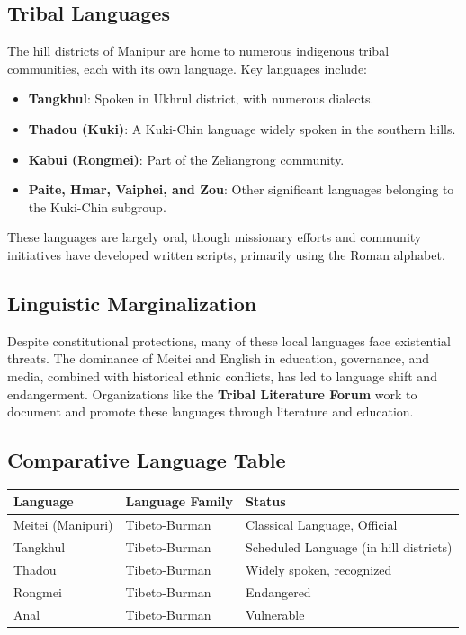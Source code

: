 \documentclass{article}
\begin{document}
\subsection{Tribal Languages}
The hill districts of Manipur are home to numerous indigenous tribal communities, each with its own language. Key languages include:
\begin{itemize}
    \item \textbf{Tangkhul}: Spoken in Ukhrul district, with numerous dialects.
    \item \textbf{Thadou (Kuki)}: A Kuki-Chin language widely spoken in the southern hills.
    \item \textbf{Kabui (Rongmei)}: Part of the Zeliangrong community.
    \item \textbf{Paite, Hmar, Vaiphei, and Zou}: Other significant languages belonging to the Kuki-Chin subgroup.
\end{itemize}
These languages are largely oral, though missionary efforts and community initiatives have developed written scripts, primarily using the Roman alphabet.

\subsection{Linguistic Marginalization}
Despite constitutional protections, many of these local languages face existential threats. The dominance of Meitei and English in education, governance, and media, combined with historical ethnic conflicts, has led to language shift and endangerment. Organizations like the \textbf{Tribal Literature Forum} work to document and promote these languages through literature and education.

\subsection{Comparative Language Table}
\begin{center}
    \begin{tabular}{|l|l|l|}
        \hline
        \textbf{Language} & \textbf{Language Family} & \textbf{Status} \\
        \hline
        Meitei (Manipuri) & Tibeto-Burman & Classical Language, Official \\
        \hline
        Tangkhul & Tibeto-Burman & Scheduled Language (in hill districts) \\
        \hline
        Thadou & Tibeto-Burman & Widely spoken, recognized \\
        \hline
        Rongmei & Tibeto-Burman & Endangered \\
        \hline
        Anal & Tibeto-Burman & Vulnerable \\
        \hline
    \end{tabular}
\end{center}
\end{document}
